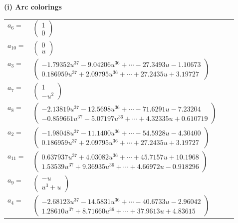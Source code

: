 \documentclass[1p]{elsarticle_modified}
\theoremstyle{definition}
\begin{document}
\flushleft \textbf{(i) Arc colorings}\\
\begin{tabular}{m{7pt} m{180pt} m{7pt} m{180pt} }
\flushright $a_{6}=$&$\begin{pmatrix}1\\0\end{pmatrix}$ \\
\flushright $a_{10}=$&$\begin{pmatrix}0\\u\end{pmatrix}$ \\
\flushright $a_{3}=$&$\begin{pmatrix}-1.79352 u^{37}-9.04206 u^{36}+\cdots-27.3493 u-1.10673\\0.186959 u^{37}+2.09795 u^{36}+\cdots+27.2435 u+3.19727\end{pmatrix}$ \\
\flushright $a_{7}=$&$\begin{pmatrix}1\\- u^2\end{pmatrix}$ \\
\flushright $a_{8}=$&$\begin{pmatrix}-2.13819 u^{37}-12.5698 u^{36}+\cdots-71.6291 u-7.23204\\-0.859661 u^{37}-5.07197 u^{36}+\cdots+4.32335 u+0.610719\end{pmatrix}$ \\
\flushright $a_{2}=$&$\begin{pmatrix}-1.98048 u^{37}-11.1400 u^{36}+\cdots-54.5928 u-4.30400\\0.186959 u^{37}+2.09795 u^{36}+\cdots+27.2435 u+3.19727\end{pmatrix}$ \\
\flushright $a_{11}=$&$\begin{pmatrix}0.637937 u^{37}+4.03082 u^{36}+\cdots+45.7157 u+10.1968\\1.53539 u^{37}+9.36935 u^{36}+\cdots+4.66972 u-0.918296\end{pmatrix}$ \\
\flushright $a_{9}=$&$\begin{pmatrix}- u\\u^3+u\end{pmatrix}$ \\
\flushright $a_{4}=$&$\begin{pmatrix}-2.68123 u^{37}-14.5831 u^{36}+\cdots-40.6733 u-2.96042\\1.28610 u^{37}+8.71660 u^{36}+\cdots+37.9613 u+4.83615\end{pmatrix}$ \\

\end{tabular}
\end{document}
